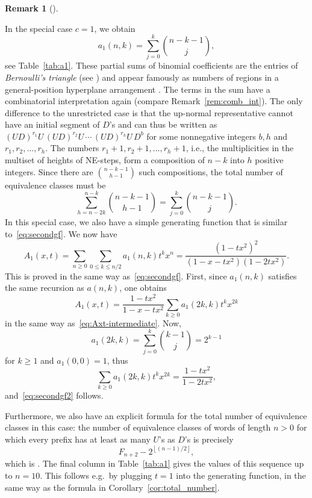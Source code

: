 \documentclass[numbers=enddot,12pt,final,onecolumn,notitlepage]{scrartcl}%
\theoremstyle{definition}
\newtheorem{remk}[theo]{Remark}
\newenvironment{remark}[1][]
{\begin{remk}[#1]\begin{leftbar}}
{\end{leftbar}\end{remk}}
\newcommand{\floor}[1]{\left\lfloor #1 \right\rfloor}
\begin{document}
\begin{remark}
In the special case $c = 1$, we obtain
\[
a_1(n,k) = \sum_{j=0}^k \binom{n-k-1}{j},
\]
see Table~\ref{tab:a1}. These partial sums of binomial coefficients are the entries of \emph{Bernoulli's triangle} (see \cite[A008949]{OEIS}) and appear famously as numbers of regions in a general-position hyperplane arrangement \cite[Proposition 2.4]{Stanley-IHA}. The terms in the sum have a combinatorial interpretation again (compare Remark~\ref{rem:comb_int}). The only difference to the unrestricted case is that the up-normal representative cannot have an initial segment of $D$'s and can thus be written as $(UD)^{r_1}U\, (UD)^{r_2}U\, \cdots\, (UD)^{r_h}U\, D^b$ for some nonnegative integers $b,h$ and $r_1,r_2,\ldots,r_h$. The numbers $r_1+1,r_2+1,\ldots,r_h+1$, i.e., the multiplicities in the multiset of heights of NE-steps, 
form a composition of $n-k$ into $h$ positive integers. Since there are $\binom{n-k-1}{h-1}$ such compositions, the total number of equivalence classes must be
\begin{equation*}
\sum_{h=n-2k}^{n-k} \binom{n-k-1}{h-1} = \sum_{j=0}^k \binom{n-k-1}{j}.
\end{equation*}
In this special case, we also have a simple generating function that is similar to~\eqref{eq:secondgf}. We now have
\begin{equation}\label{eq:secondgf2}
A_1(x,t) = \sum_{n \geq 0} \sum_{0 \leq k \leq n/2} a_1(n,k)t^k x^n = \frac{(1-tx^2)^2}{(1-x-tx^2)(1-2tx^2)}.
\end{equation}
This is proved in the same way as~\eqref{eq:secondgf}. First, since $a_1(n,k)$ satisfies the same recursion as $a(n,k)$, one obtains
\begin{equation*}
A_1(x,t) = \frac{1-tx^2}{1-x-tx^2} \sum_{k \geq 0} a_1(2k,k) t^k x^{2k}
\end{equation*}
in the same way as~\eqref{eq:Axt-intermediate}. Now,
\begin{equation*}
    a_1(2k,k) = \sum_{j=0}^k \binom{k-1}{j} = 2^{k-1}
\end{equation*}
for $k \geq 1$ and $a_1(0,0) = 1$, thus
\begin{equation*}
\sum_{k \geq 0} a_1(2k,k) t^k x^{2k} = \frac{1-tx^2}{1-2tx^2},
\end{equation*}
and~\eqref{eq:secondgf2} follows.

Furthermore, we also have an explicit formula for the total number of equivalence classes in this case: the number of equivalence classes of words of length $n > 0$ for which every prefix has at least as many $U$'s as $D$'s is precisely
    \[F_{n+2} - 2^{\floor{(n-1)/2}},\]
which is \cite[A079289]{OEIS}. The final column in Table~\ref{tab:a1} gives the values of this sequence up to $n=10$. This follows e.g.~by plugging $t=1$ into the generating function, in the same way as the formula in Corollary~\ref{cor:total_number}.
\end{remark}
\end{document}
